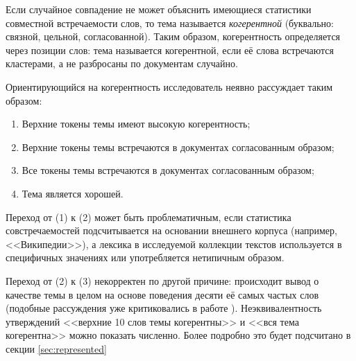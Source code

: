 Если случайное совпадение не может объяснить имеющиеся статистики совместной встречаемости слов, то тема называется \textit{когерентной} (буквально: связной, цельной, согласованной). Таким образом, когерентность определяется через позиции слов: тема называется когерентной, если её слова встречаются кластерами, а не разбросаны по документам случайно.

Ориентирующийся на когерентность исследователь неявно рассуждает таким образом:
\begin{enumerate}
    \item Верхние токены темы имеют высокую когерентность;
    \item Верхние токены темы встречаются в документах согласованным образом;
    \item Все токены темы встречаются в документах согласованным образом;
    \item Тема является хорошей.
\end{enumerate}

Переход от (1) к (2) может быть проблематичным, если статистика совстречаемостей подсчитывается на основании внешнего корпуса (например, <<Википедии>>), а лексика в исследуемой коллекции текстов используется в специфичных значениях или употребляется нетипичным образом.

Переход от (2) к (3) некорректен по другой причине: происходит вывод о качестве темы в целом на основе поведения десяти её самых частых слов (подобные рассуждения уже критиковались в работе  \cite{dh_sea}). Неэквивалентность утверждений <<верхние 10 слов темы когерентны>> и <<вся тема когерентна>> можно показать численно. Более подробно это будет подсчитано в секции \ref{sec:represented}





